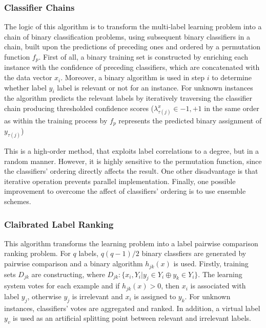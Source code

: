 \documentclass[12pt]{report}
\begin{document}
	\subsubsection*{Classifier Chains}
	The logic of this algorithm is to transform the multi-label learning problem
  into a chain of binary classification problems, using subsequent binary
  classifiers in a chain, built upon the predictions of preceding ones and
  ordered by a permutation function $f_p$. First of all, a binary training set
  is constructed by enriching each instance with the confidence of preceding
  classifiers, which are concatenated with the data vector $x_i$. Moreover, a binary algorithm is used in step $i$ to
  determine whether label $y_i$ label is relevant or not for an instance. For
  unknown instances the algorithm predicts the relevant labels by iteratively
  traversing the classifier chain producing thresholded confidence scores ($\lambda _{\tau(j)}^x \in {-1, +1}$ in the
  same order as within the training process by $f_p$ represents the predicted binary assignment of $y_{\tau(j)}$)
	
	This is a high-order method, that exploits label correlations to a degree, but in a random manner. However, it is highly sensitive to the permutation function, since the classifiers' ordering directly affects the result. One other disadvantage is that iterative operation prevents parallel implementation. Finally, one possible improvement to overcome the affect of classifiers' ordering is to use ensemble schemes.
	
	\subsubsection*{Claibrated Label Ranking}
	This algorithm transforms the learning problem into a label pairwise comparison ranking problem. For $q$ labels, $q(q-1)/2$ binary classfiers are generated by pairwise comparison and a binary algorithm $h_{jk}(x)$ is used. Firstly, training sets $D_{jk}$ are constructing, where $D_{jk}: \{x_i, Y_i | y_j \in Y_i \oplus y_k \in Y_i\}$. The learning system votes for each example and if $h_{jk}(x)>0$, then $x_i$ is associated with label $y_j$, otherwise $y_j$ is irrelevant and $x_i$ is assigned to $y_k$. For unknown instances, classifiers' votes are aggregated and ranked. In addition, a virtual label $y_v$ is used as an artificial splitting point between relevant and irrelevant labels.
	
\end{document}

